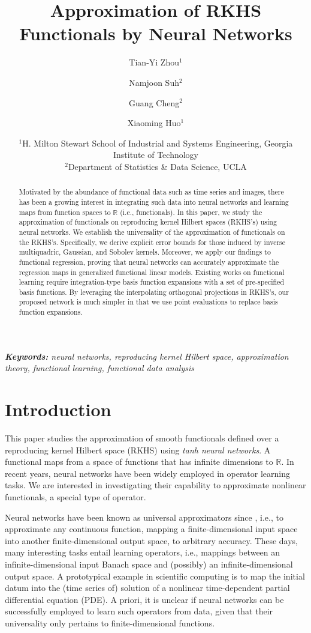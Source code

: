 \documentclass{article}
\title{Approximation of RKHS Functionals by Neural Networks}
\author{Tian-Yi Zhou$^1$ \and Namjoon Suh$^2$ \and Guang Cheng$^2$ \and Xiaoming Huo$^1$}
\date{%
    $^1$H. Milton Stewart School of Industrial and Systems Engineering, Georgia Institute of Technology\\%
    $^2$Department of Statistics \& Data Science, UCLA\\[2ex]%
}
\def\RR{\mathbb R}
\numberwithin{equation}{section}
\begin{document}
\maketitle 
\begin{abstract}
 \noindent  Motivated by the abundance of functional data such as time series and images, there has been a growing interest in integrating such data into neural networks and learning maps from function spaces to $\RR$ (i.e., functionals). In this paper, we study the approximation of functionals on reproducing kernel Hilbert spaces (RKHS's) using neural networks. We establish the universality of the approximation of functionals on the RKHS's. Specifically, we derive explicit error bounds for those induced by inverse multiquadric, Gaussian, and Sobolev kernels. 
Moreover, we apply our findings to functional regression, proving that neural networks
can accurately approximate the regression maps in generalized functional linear models.
Existing works on functional learning require integration-type basis function expansions with a set of pre-specified basis functions. 
By leveraging the interpolating orthogonal
projections in RKHS's, our proposed network is much simpler in that we use point evaluations to replace basis function expansions.  

\end{abstract} 
{\it{\bf Keywords:} neural networks, reproducing kernel Hilbert space, approximation theory, functional learning, functional data analysis}
 \section{Introduction}
This paper studies the approximation of smooth functionals defined over a reproducing kernel
Hilbert space (RKHS) using {\it tanh neural networks}.  A functional maps from a space of functions that has infinite dimensions to $\RR$. 
In recent years, neural networks have been widely employed in operator learning tasks. We are interested in investigating their capability to approximate nonlinear functionals, a special type of operator. 

 Neural networks have been known as universal approximators since \citep{cybenko1989approximation}, i.e., to approximate any continuous function, mapping a finite-dimensional input space into
another finite-dimensional output space, to arbitrary accuracy. 
These days, many interesting tasks entail learning operators, i.e., mappings between an infinite-dimensional input Banach space and (possibly) an infinite-dimensional output space.
A prototypical example in scientific computing is to map the initial datum into the (time series of) solution of a nonlinear time-dependent partial differential equation (PDE).
A priori, it is unclear if neural networks can be successfully employed to learn such operators from data, given that their universality only pertains to finite-dimensional functions.
\end{document}
